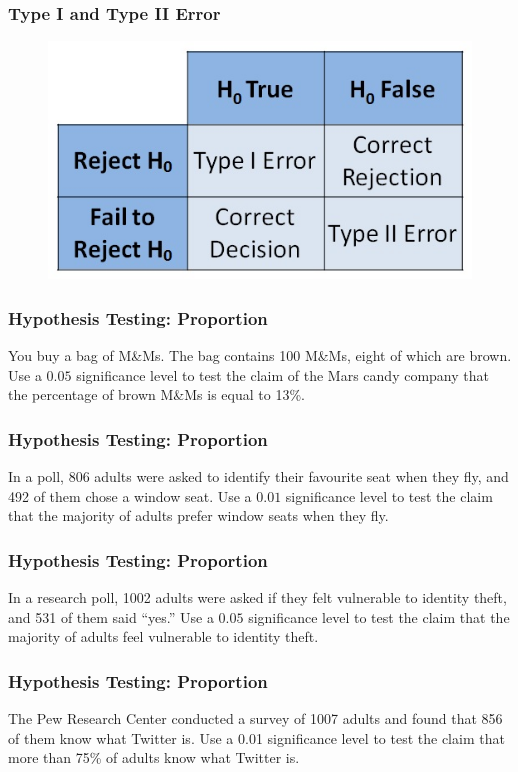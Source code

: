 \documentclass[xcolor=dvipsnames]{beamer}
\begin{document}
\begin{frame}
  \frametitle{Type I and Type II Error}
  \begin{figure}[h]
    \includegraphics[scale=0.5]{./diagrams/error.jpg}
  \end{figure}
\end{frame}

\begin{frame}
  \frametitle{Hypothesis Testing: Proportion}
  {\ubung} You buy a bag of M\&Ms. The bag contains 100 M\&Ms, eight
  of which are brown. Use a $0.05$ significance level to test the
  claim of the Mars candy company that the percentage of brown M\&Ms
  is equal to 13\%.
\end{frame}

\begin{frame}
  \frametitle{Hypothesis Testing: Proportion}
  {\ubung} In a poll, 806 adults were asked to identify their favourite seat
  when they fly, and 492 of them chose a window seat. Use a $0.01$
  significance level to test the claim that the majority of adults
  prefer window seats when they fly.
\end{frame}

\begin{frame}
  \frametitle{Hypothesis Testing: Proportion}
  {\ubung} In a research poll, 1002 adults were asked if they felt
  vulnerable to identity theft, and 531 of them said ``yes.'' Use a
  $0.05$ significance level to test the claim that the majority of
  adults feel vulnerable to identity theft.
\end{frame}

\begin{frame}
  \frametitle{Hypothesis Testing: Proportion} 
  {\ubung} The Pew Research Center conducted a survey of 1007 adults
  and found that 856 of them know what Twitter is. Use a 0.01
  significance level to test the claim that more than 75\% of adults
  know what Twitter is.
\end{frame}
\end{document}
